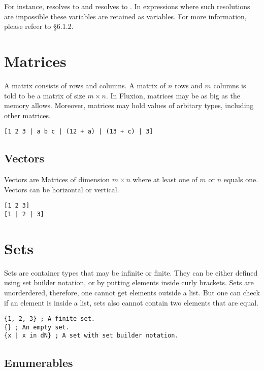 \documentclass[11pt,a4paper]{book}
\begin{document}
For instance,  resolves to  and  resolves to . In expressions where such resolutions are impossible these variables are retained as variables. For more information, please refeer to \S 6.1.2.

\section{Matrices}

A matrix consists of rows and columns. A matrix of $n$ rows and $m$ columns is told to be a matrix of size $m \times n$. In Fluxion, matrices may be as big as the memory allows. Moreover, matrices may hold values of arbitary types, including other matrices.

\begin{lstlisting}[caption={An example matrix},captionpos=b]
[1 2 3 | a b c | (12 + a) | (13 + c) | 3]
\end{lstlisting}

\subsection{Vectors}

Vectors are Matrices of dimension $m \times n$ where at least one of $m$ or $n$ equals one. Vectors can be horizontal or vertical.

\begin{lstlisting}[caption={Example vectors},captionpos=b]
[1 2 3]
[1 | 2 | 3]
\end{lstlisting}

\section{Sets}

Sets are container types that may be infinite or finite. They can be either defined using set builder notation, or by putting elements inside curly brackets. Sets are unorderdered, therefore, one cannot get elements outside a list. But one can check if an element is inside a list, sets also cannot contain two elements that are equal.

\begin{lstlisting}[caption={Example vectors},captionpos=b]
{1, 2, 3} ; A finite set.
{} ; An empty set.
{x | x in dN} ; A set with set builder notation.
\end{lstlisting}

\subsection{Enumerables}
\end{document}
